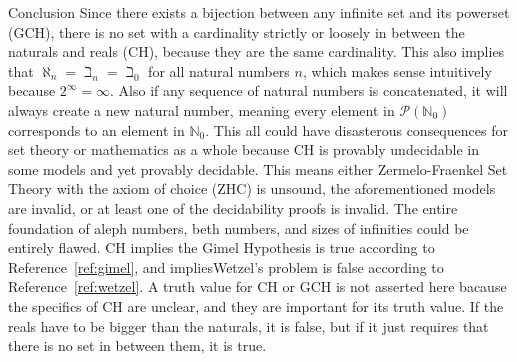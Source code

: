 \documentclass[12pt]{article}
\begin{document}
\begin{section}{Conclusion}\label{sec:conclusion}
	Since there exists a bijection between any infinite set and its powerset (GCH), there is no
	set with a cardinality strictly or loosely in between the naturals and reals (CH), because
	they are the same cardinality. This also implies that $\aleph_n=\beth_n=\beth_0$ for all
	natural numbers $n$, which makes sense intuitively because $2^\infty=\infty$. Also if any
	sequence of natural numbers is concatenated, it will always create a new natural number,
	meaning every element in $\mathcal P(\mathbb N_0)$ corresponds to an element in
	$\mathbb N_0$. This all could have disasterous consequences for set theory or mathematics as
	a whole because CH is provably undecidable in some models and yet provably decidable. This
	means either Zermelo-Fraenkel Set Theory with the axiom of choice (ZHC) is unsound, the
	aforementioned models are invalid, or at least one of the decidability proofs is invalid. The
	entire foundation of aleph numbers, beth numbers, and sizes of infinities could be entirely
	flawed. CH implies the Gimel Hypothesis is true according to Reference~\ref{ref:gimel}, and
	impliesWetzel's problem is false according to Reference~\ref{ref:wetzel}. A truth value for
	CH or GCH is not asserted here bacause the specifics of CH are unclear, and they are
	important for its truth value. If the reals have to be bigger than the naturals, it is false,
	but if it just requires that there is no set in between them, it is true.
\end{section}
\end{document}
